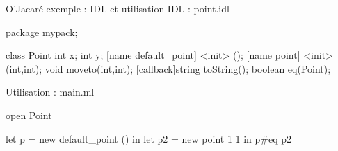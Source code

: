 \documentclass[xcolor={table,dvipsnames}]{beamer}
\begin{document}
\begin{frame}[fragile]{O'Jacaré exemple : IDL et utilisation}
  IDL : point.idl
\begin{idlEx} 
package mypack;

class Point {
  int x;
  int y; 
  [name default_point] <init> ();
  [name point] <init> (int,int);
  void moveto(int,int);
  [callback]string toString();
  boolean eq(Point);
}
\end{idlEx}

Utilisation : main.ml
\begin{OCamlEx}
  open Point

  let p = new default_point () in
  let p2 = new point 1 1 in
  p#eq p2
\end{OCamlEx}
\end{frame}
\end{document}
